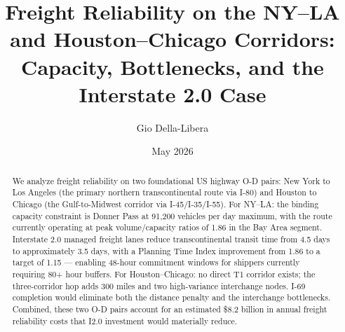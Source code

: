 \documentclass[12pt]{article}
\title{Freight Reliability on the NY--LA and Houston--Chicago Corridors:\\
       Capacity, Bottlenecks, and the Interstate 2.0 Case}
\author{Gio Della-Libera}
\date{May 2026}
\begin{document}
\maketitle
\begin{abstract}
We analyze freight reliability on two foundational US highway O-D pairs: New York to Los Angeles (the primary northern transcontinental route via I-80) and Houston to Chicago (the Gulf-to-Midwest corridor via I-45/I-35/I-55). For NY--LA: the binding capacity constraint is Donner Pass at 91,200 vehicles per day maximum, with the route currently operating at peak volume/capacity ratios of 1.86 in the Bay Area segment. Interstate 2.0 managed freight lanes reduce transcontinental transit time from 4.5 days to approximately 3.5 days, with a Planning Time Index improvement from 1.86 to a target of 1.15 --- enabling 48-hour commitment windows for shippers currently requiring 80+ hour buffers. For Houston--Chicago: no direct T1 corridor exists; the three-corridor hop adds 300 miles and two high-variance interchange nodes. I-69 completion would eliminate both the distance penalty and the interchange bottlenecks. Combined, these two O-D pairs account for an estimated \$8.2 billion in annual freight reliability costs that I2.0 investment would materially reduce.
\end{abstract}









\end{document}
